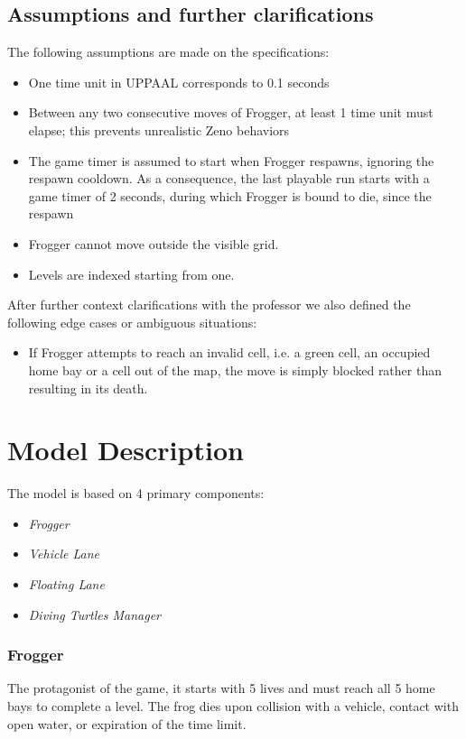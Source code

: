 \documentclass[a4paper]{article}
\begin{document}
\subsection{Assumptions and further clarifications}
The following assumptions are made on the specifications:
\begin{itemize}
    \item One time unit in UPPAAL corresponds to 0.1 seconds
    \item Between any two consecutive moves of Frogger, at least 1 time unit must elapse; this prevents unrealistic Zeno behaviors
    \item The game timer is assumed to start when Frogger respawns, ignoring the 
    respawn cooldown. As a consequence, the last playable run starts with a game 
    timer of 2 seconds, during which Frogger is bound to die, since the respawn 
    \item Frogger cannot move outside the visible grid. 
    \item Levels are indexed starting from one.
\end{itemize}

After further context clarifications with the professor we also defined the following edge cases or ambiguous situations:
\begin{itemize}
\item If Frogger attempts to reach an invalid cell, i.e. a green cell, an occupied home bay
    or a cell out of the map, the move is simply blocked rather than resulting in its death.
\end{itemize}

\newpage
\section{Model Description}
The model is based on 4 primary components:
\begin{itemize}
    \item \textit{Frogger}
    \item \textit{Vehicle Lane}
    \item \textit{Floating Lane}
    \item \textit{Diving Turtles Manager}
\end{itemize}

\subsubsection*{Frogger}
The protagonist of the game, it starts with 5 lives and must reach all 5 home bays to complete a level. The frog dies upon collision with a vehicle, contact with open water, or expiration of the time limit.
\end{document}
